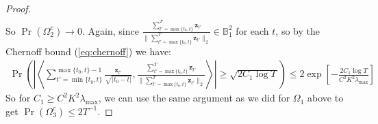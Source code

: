\begin{proof}
\begin{align*}
\end{align*}
So $\Pr(\Omega_2^c) \to 0.$ Again, since $\frac{\sum_{t'=\max\{t_0,t\}}^{T}\mathbf{z}_{t'}}{\lVert\sum_{t'=\max\{t_0,t\}}^{T}\mathbf{z}_{t'}\rVert_2} \in \mathbb{B}^2_1$ for each $t$, so by the Chernoff bound (\ref{eq:chernoff}) we have:
\begin{align*}
    \Pr\left(\left|\left\langle \sum_{t'=\min\{t_0,t\}}^{\max\{t_0,t\}-1}\frac{\mathbf{z}_{t'}}{\sqrt{|t_0-t|}}, \frac{\sum_{t'=\max\{t_0,t\}}^{T}\mathbf{z}_{t'}}{\lVert\sum_{t'=\max\{t_0,t\}}^{T}\mathbf{z}_{t'}\rVert_2}\right\rangle\right| \geq \sqrt{2C_1\log T}\right) \leq 2\exp\left[-\frac{2C_1\log T}{C^2K^2\lambda_{\max}}\right] 
\end{align*}
So for $C_1 \geq C^2K^2\lambda_{\max}$, we can use the same argument as we did for $\Omega_1$ above to get $\Pr(\Omega_3^c) \leq 2T^{-1}$.


\end{proof}

